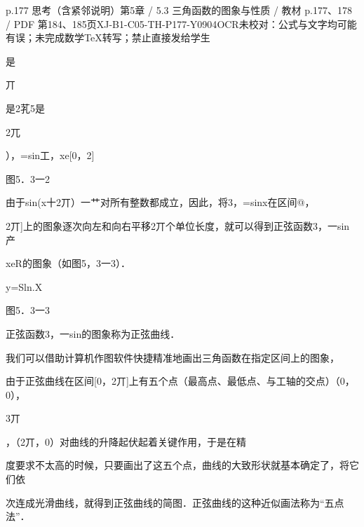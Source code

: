 \begin{bankitem}{p.177 思考（含紧邻说明）}{第5章 / 5.3 三角函数的图象与性质 / 教材 p.177、178 / PDF 第184、185页}{XJ-B1-C05-TH-P177-Y0904}{OCR未校对：公式与文字均可能有误；未完成数学TeX转写；禁止直接发给学生}
\begin{ocrdraft}
是
\par
丌
\par
是2芤5是
\par
2兀
\par
），=sin工，xe[0，2]
\par
图5．3一2
\par
由于sin(x十2丌）一艹对所有整数都成立，因此，将3，=sinx在区间@，
\par
2丌]上的图象逐次向左和向右平移2丌个单位长度，就可以得到正弦函数3，一sin产
\par
xeR的图象（如图5，3一3）．
\par
y=Sln.X
\par
图5．3一3
\par
正弦函数3，一sin的图象称为正弦曲线．
\par
我们可以借助计算机作图软件快捷精准地画出三角函数在指定区间上的图象，
\par
由于正弦曲线在区间[0，2丌]上有五个点（最高点、最低点、与工轴的交点）（0，0），
\par
3丌
\par
，（2丌，0）对曲线的升降起伏起着关键作用，于是在精
\par
度要求不太高的时候，只要画出了这五个点，曲线的大致形状就基本确定了，将它们依
\par
次连成光滑曲线，就得到正弦曲线的简图．正弦曲线的这种近似画法称为“五点法”．
\end{ocrdraft}
\end{bankitem}
